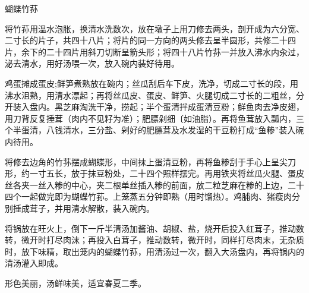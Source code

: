 \begin{recipe}{蝴蝶竹荪}

\ingredients



\cooking

\step 将竹荪用温水泡胀，换清水洗数次，放在墩子上用刀修去两头，剖开成为六分宽、二寸长的片子，共四十八片；将片的同一方向的两头修去呈半圆形，共修二十四片，余下的二十四片用斜刀切断呈箭头形；将四十八片竹荪一并放入沸水内汆过，泌去清水，用好汤喂一次，放入碗内装好待用。

\step 鸡蛋摊成蛋皮;鲜笋煮熟放在碗内；丝瓜刮后车下皮，洗净，切成二寸长的段，用沸水沮熟，用清水漂起；再将丝瓜皮、蛋皮、鲜笋、火腿切成二寸长的二粗丝，分开装入盘内。黑芝麻淘洗干净，捞起；半个蛋清拌成蛋清豆粉；鲜鱼肉去净皮翅，用刀背反复捶茸（肉内不见籽为准）；肥膘剁细〔如油脂）。再将鱼茸放入瓢内，三个半蛋清，八钱清水，三分盐、剁好的肥膘茸及水发湿的干豆粉打成“鱼糁”装入碗内待用。

\step 将修去边角的竹荪摆成蝴蝶形，中间抹上蛋清豆粉，再将鱼糁刮于手心上呈尖刀形，约一寸五长，放于抹豆粉处，二十四个照样摆完。再用铁夹将丝瓜火腿、蛋皮丝各夹一丝入糁的中心，夹二根单丝插入糁的前面，放二粒芝麻在糁的上边，二十四个一起做完即为蝴蝶竹荪。上笼蒸五分钟即熟（用时馏热）。鸡脯肉、猪瘦肉分别捶成茸子，并用清水解散，装入碗内。

\step 将锅放在旺火上，倒下一斤半清汤加酱油、胡椒、盐，烧开后投入红茸子，推动数转，微开时打尽肉沫；再投入白茸子，推动数转，微开时，同样打尽肉末，无杂质时，放下味精，取出笼内的蝴蝶竹荪，用清汤过一次，翻入大汤盘内，再将锅内的清汤灌入即成。

\notes

形色美丽，汤鲜味美，适宜春夏二季。

\end{recipe}

